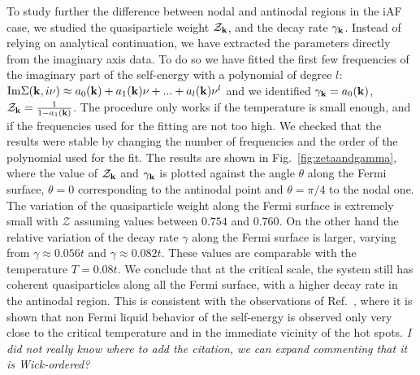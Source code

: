 To study further the difference between nodal and antinodal regions in the iAF case, we studied the quasiparticle weight\cite{Abrikosov1963,Metzner2012} $\mathcal{Z}_{\mathbf{k}}$, and the decay rate $\gamma_{\mathbf{k}}$.
Instead of relying on analytical continuation, we have extracted the parameters directly from the imaginary axis data.
To do so we have fitted the first few frequencies of the imaginary part of the self-energy with a polynomial of degree $l$: $\mathrm{Im}\Sigma(\mathbf{k},i\nu)\approx a_0(\mathbf{k})+a_1(\mathbf{k})\nu+...+a_l(\mathbf{k})\nu^l$ and we identified $\gamma_{\mathbf{k}}=a_0(\mathbf{k})$, $\mathcal{Z}_{\mathbf{k}}= \frac{1}{1-a_1(\mathbf{k})}$.
The procedure only works if the temperature is small enough, and if the frequencies used for the fitting are not too high. We checked that the results were stable by changing the number of frequencies and the order of the polynomial used for the fit. 
The results are shown in Fig.~\ref{fig:zetaandgamma}, where the value of $\mathcal{Z}_{\mathbf{k}}$ and $\gamma_{\mathbf{k}}$ is plotted against the angle $\theta$ along the Fermi surface, $\theta=0$ corresponding to the antinodal point and $\theta=\pi/4$ to the nodal one. 
The variation of the quasiparticle weight along the Fermi surface is extremely small with $\mathcal{Z}$ assuming values between $0.754$ and $0.760$. 
On the other hand the relative variation of the decay rate $\gamma$ along the Fermi surface is larger, varying from $\gamma\approx 0.056t$ and $\gamma \approx 0.082t$. These values are comparable with the temperature $T=0.08t$. 
We conclude that at the critical scale, the system still has coherent quasiparticles along all the Fermi surface, with a higher decay rate in the antinodal region. This is consistent with the observations of Ref.~\cite{Rohe2005}, where it is shown that non Fermi liquid behavior of the self-energy is observed only very close to the critical temperature and in the immediate vicinity of the hot spots. \emph{I did not really know where to add the citation, we can expand commenting that it is Wick-ordered?}  
